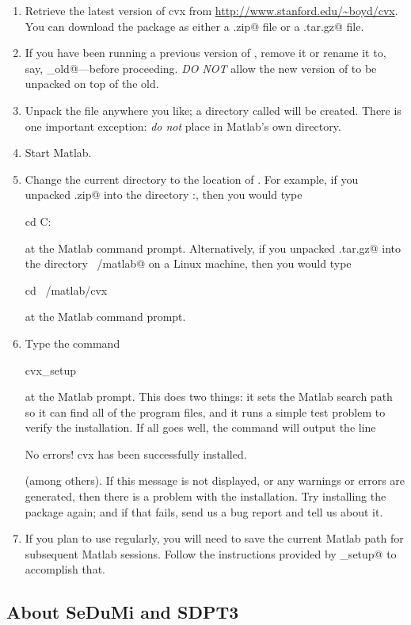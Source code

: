 \documentclass[12pt]{article}
\begin{document}
\begin{enumerate}
\item Retrieve the latest version of cvx from \url{http://www.stanford.edu/~boyd/cvx}.
You can download the package as either a \verb@.zip@ file or a \verb@.tar.gz@ 
file.
\item If you have been running a previous version of \cvx, remove it or
rename it to, say, \verb@cvx_old@---before proceeding.
\emph{DO NOT} allow the new version of \cvx to be unpacked on top of the old.
\item Unpack the file anywhere you like; a directory called \verb@cvx@ will be created.
There is one important exception: \emph{do not} place \cvx in Matlab's own
\verb@toolbox@ directory.
\item Start Matlab.
\item Change the current directory to the location of \cvx.
For example, if you unpacked \verb@cvx.zip@ into the
directory \verb@C:\Matlab\personal@, then you would type
\begin{code}
		cd C:\Matlab\personal\cvx
\end{code}
at the Matlab command prompt. Alternatively, if you unpacked \verb@cvx.tar.gz@
into the directory \verb@~/matlab@ on a Linux machine, then you would type
\begin{code}
		cd ~/matlab/cvx
\end{code}
at the Matlab command prompt.
\item Type the command
\begin{code}
		cvx_setup
\end{code}
at the Matlab prompt. This does two things: 
it sets the Matlab search path so it can find all of the \cvx program files,
and it runs a simple test problem to verify the installation. 
If all goes well, the command will output the line
\begin{code}
	No errors! cvx has been successfully installed.
\end{code}
(among others). If this message is not displayed, or any warnings or errors are generated,
then there is a problem with the \cvx installation. Try installing the package
again; and if that fails, send us a bug report and tell us about it.
\item If you plan to use \cvx regularly, you will need to save the current
Matlab path for subsequent Matlab sessions. Follow the instructions provided
by \verb@cvx_setup@ to accomplish that.
\end{enumerate}

\subsection{About SeDuMi and SDPT3}
\end{document}
